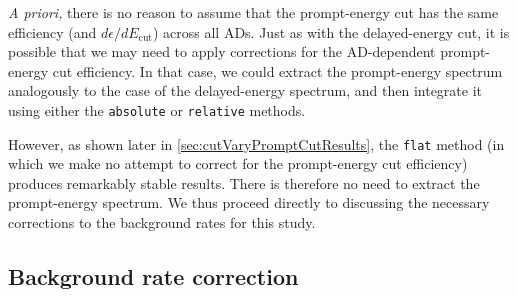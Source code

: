 \documentclass[../thesis.tex]{subfiles}
\begin{document}
\emph{A priori,} there is no reason to assume that the prompt-energy cut has the same efficiency (and $d\epsilon/dE_{\mathrm{cut}}$) across all ADs. Just as with the delayed-energy cut, it is possible that we may need to apply corrections for the AD-dependent prompt-energy cut efficiency. In that case, we could extract the prompt-energy spectrum analogously to the case of the delayed-energy spectrum, and then integrate it using either the \texttt{absolute} or \texttt{relative} methods.
%
\begin{comment}
Compared to the delayed-energy spectrum, it may be possible to more accurately measure the absolute efficiency, given the lack of a long tail. Even though the rate of prompt-like singles rises very steeply around 0.7~MeV, the accidentals rate is bottlenecked by the rate of delayed-like singles, so the accidentals subtraction can still be performed accurately. However, the \emph{correlated} backgrounds each have their own externally supplied prompt-energy spectra, which (as described in \autoref{sec:cutVaryPromptCutBkg}) must be individually integrated (to scale the rate) and subtracted. Hence, the measured prompt-energy spectrum could be skewed by any errors in the rates and spectra of the correlated backgrounds. Fortunately, the total rate of the correlated backgrounds is quite low.
We therefore don't expect the correlated backgrounds to pose a major difficulty in the prompt-energy spectrum extraction.
The above discussion is irrelevant, however, because as we shall see, the \texttt{flat} method (in which we make no attempt to correct for the prompt-energy cut efficiency) produces remarkably stable results. There is therefore no need to extract the prompt spectrum, so we will leave it at that.
\end{comment}
However, as shown later in \autoref{sec:cutVaryPromptCutResults}, the \texttt{flat} method (in which we make no attempt to correct for the prompt-energy cut efficiency) produces remarkably stable results. There is therefore no need to extract the prompt-energy spectrum. We thus proceed directly to discussing the necessary corrections to the background rates for this study.

\subsection{Background rate correction}
\label{sec:cutVaryPromptCutBkg}
\end{document}
